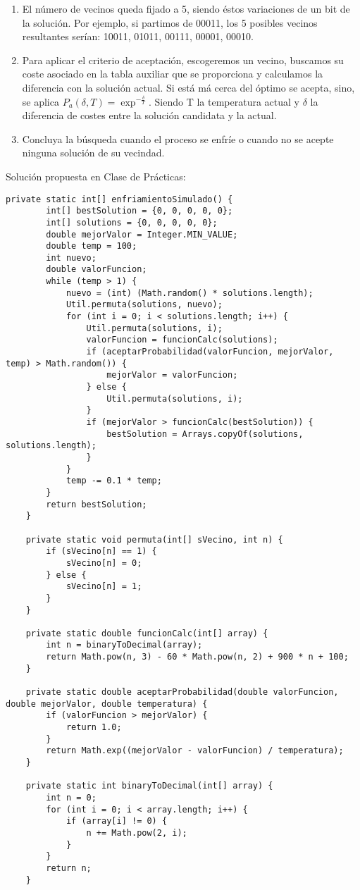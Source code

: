 \documentclass{llncs}
\begin{document}
\begin{enumerate}
\item El n\'{u}mero de vecinos queda fijado a 5, siendo \'{e}stos variaciones de un bit de la soluci\'{o}n. Por ejemplo, si partimos de 00011, los 5 posibles vecinos resultantes ser\'{i}an: 10011, 01011, 00111, 00001, 00010.
\item Para aplicar el criterio de aceptaci\'{o}n, escogeremos un vecino, buscamos su coste asociado en la tabla auxiliar que se proporciona y calculamos la diferencia con la soluci\'{o}n actual. Si est\'{a} m\'{a} cerca del \'{o}ptimo se acepta, sino, se aplica $P_a(\delta, T) = \exp^{-\frac{\delta}{T}}$. Siendo T la temperatura actual y $\delta$ la diferencia de costes entre la soluci\'{o}n candidata y la actual.
\item Concluya la b\'{u}squeda cuando el proceso se enfr\'{i}e o cuando no se acepte ninguna soluci\'{o}n de su vecindad.
\end{enumerate}

Soluci\'{o}n propuesta en Clase de Pr\'{a}cticas:\\
\lstset{language=Java} 
\begin{lstlisting}
private static int[] enfriamientoSimulado() {
        int[] bestSolution = {0, 0, 0, 0, 0};
        int[] solutions = {0, 0, 0, 0, 0};
        double mejorValor = Integer.MIN_VALUE;
        double temp = 100;
        int nuevo;
        double valorFuncion;
        while (temp > 1) {
            nuevo = (int) (Math.random() * solutions.length);
            Util.permuta(solutions, nuevo);
            for (int i = 0; i < solutions.length; i++) {
                Util.permuta(solutions, i);
                valorFuncion = funcionCalc(solutions);
                if (aceptarProbabilidad(valorFuncion, mejorValor, temp) > Math.random()) {
                    mejorValor = valorFuncion;
                } else {
                    Util.permuta(solutions, i);
                }
                if (mejorValor > funcionCalc(bestSolution)) {
                    bestSolution = Arrays.copyOf(solutions, solutions.length);
                }
            }
            temp -= 0.1 * temp;
        }
        return bestSolution;
    }

    private static void permuta(int[] sVecino, int n) {
        if (sVecino[n] == 1) {
            sVecino[n] = 0;
        } else {
            sVecino[n] = 1;
        }
    }

    private static double funcionCalc(int[] array) {
        int n = binaryToDecimal(array);
        return Math.pow(n, 3) - 60 * Math.pow(n, 2) + 900 * n + 100;
    }

    private static double aceptarProbabilidad(double valorFuncion, double mejorValor, double temperatura) {
        if (valorFuncion > mejorValor) {
            return 1.0;
        }
        return Math.exp((mejorValor - valorFuncion) / temperatura);
    }

    private static int binaryToDecimal(int[] array) {
        int n = 0;
        for (int i = 0; i < array.length; i++) {
            if (array[i] != 0) {
                n += Math.pow(2, i);
            }
        }
        return n;
    }
\end{lstlisting}
\end{document}
